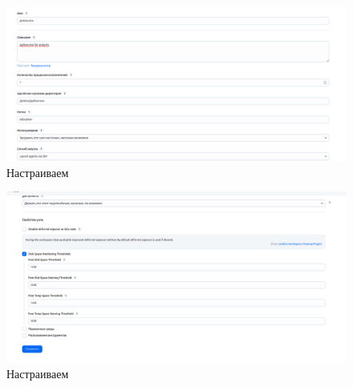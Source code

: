 \begin{figure}[h!]
    \centering
    \includegraphics[width=0.5\linewidth]{pic/5.png}
    \caption{Настраиваем}
    \label{fig:enter-label}
\end{figure}

\begin{figure}[h!]
    \centering
    \includegraphics[width=0.5\linewidth]{pic/6.png}
    \caption{Настраиваем}
    \label{fig:enter-label}
\end{figure}

